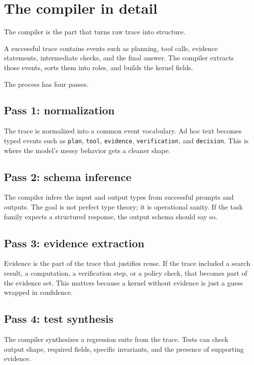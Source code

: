 \documentclass{article}
\begin{document}
\section{The compiler in detail}

The compiler is the part that turns raw trace into structure.

A successful trace contains events such as planning, tool calls, evidence statements, intermediate checks, and the final answer. The compiler extracts those events, sorts them into roles, and builds the kernel fields.

The process has four passes.

\subsection{Pass 1: normalization}
The trace is normalized into a common event vocabulary. Ad hoc text becomes typed events such as \texttt{plan}, \texttt{tool}, \texttt{evidence}, \texttt{verification}, and \texttt{decision}. This is where the model’s messy behavior gets a cleaner shape.

\subsection{Pass 2: schema inference}
The compiler infers the input and output types from successful prompts and outputs. The goal is not perfect type theory; it is operational sanity. If the task family expects a structured response, the output schema should say so.

\subsection{Pass 3: evidence extraction}
Evidence is the part of the trace that justifies reuse. If the trace included a search result, a computation, a verification step, or a policy check, that becomes part of the evidence set. This matters because a kernel without evidence is just a guess wrapped in confidence.

\subsection{Pass 4: test synthesis}
The compiler synthesizes a regression suite from the trace. Tests can check output shape, required fields, specific invariants, and the presence of supporting evidence.
\end{document}
